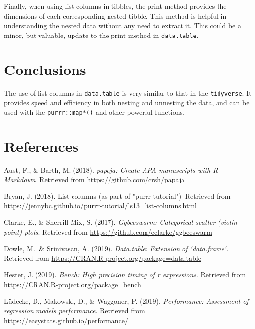 \documentclass[doc,floatsintext]{apa6}
\begin{document}
Finally, when using list-columns in tibbles, the print method provides the dimensions of each corresponding nested tibble. This method is helpful in understanding the nested data without any need to extract it. This could be a minor, but valuable, update to the print method in \texttt{data.table}.

\hypertarget{conclusions}{%
\section{Conclusions}\label{conclusions}}

The use of list-columns in \texttt{data.table} is very similar to that in the \texttt{tidyverse}. It provides speed and efficiency in both nesting and unnesting the data, and can be used with the \texttt{purrr::map*()} and other powerful functions.

\hypertarget{references}{%
\section{References}\label{references}}

\begingroup
\setlength{\parindent}{-0.5in}
\setlength{\leftskip}{0.5in}

\hypertarget{refs}{}
\leavevmode\hypertarget{ref-R-papaja}{}%
Aust, F., \& Barth, M. (2018). \emph{papaja: Create APA manuscripts with R Markdown}. Retrieved from \url{https://github.com/crsh/papaja}

\leavevmode\hypertarget{ref-jenny}{}%
Bryan, J. (2018). List columns (as part of "purrr tutorial"). Retrieved from \url{https://jennybc.github.io/purrr-tutorial/ls13_list-columns.html}

\leavevmode\hypertarget{ref-R-ggbeeswarm}{}%
Clarke, E., \& Sherrill-Mix, S. (2017). \emph{Ggbeeswarm: Categorical scatter (violin point) plots}. Retrieved from \url{https://github.com/eclarke/ggbeeswarm}

\leavevmode\hypertarget{ref-R-data.table}{}%
Dowle, M., \& Srinivasan, A. (2019). \emph{Data.table: Extension of `data.frame`}. Retrieved from \url{https://CRAN.R-project.org/package=data.table}

\leavevmode\hypertarget{ref-R-bench}{}%
Hester, J. (2019). \emph{Bench: High precision timing of r expressions}. Retrieved from \url{https://CRAN.R-project.org/package=bench}

\leavevmode\hypertarget{ref-R-performance}{}%
Lüdecke, D., Makowski, D., \& Waggoner, P. (2019). \emph{Performance: Assessment of regression models performance}. Retrieved from \url{https://easystats.github.io/performance/}
\end{document}
